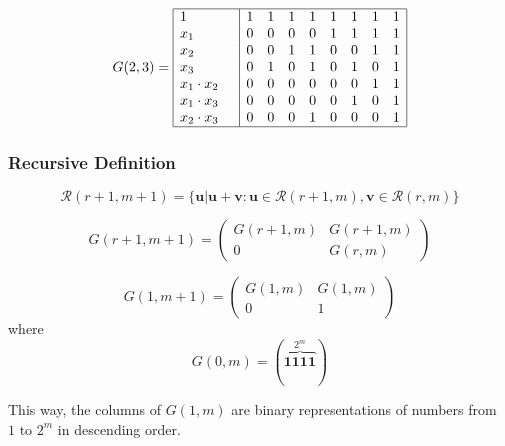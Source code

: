 \message{ !name(1.tex)}\documentclass[xcolor=xvgnames]{beamer}
\newcommand{\RM}[2]{\ensuremath{\mathcal{R}(#1,#2)}}
\newcommand{\V}[1]{\ensuremath{\mathbf{#1}}}
\begin{document}

\begin{frame}
 \begin{equation*}
G(2,3) =\begin{array}{|l|cccccccc|}
\hline
1 \quad&         1&1&1&1&1&1&1&1 \\
x_1 \quad&       0&0&0&0&1&1&1&1 \\
x_2 \quad&       0&0&1&1&0&0&1&1 \\
x_3 \quad&       0&1&0&1&0&1&0&1 \\
x_1\cdot x_2 \quad& 0&0&0&0&0&0&1&1 \\ 
x_1\cdot x_3 \quad& 0&0&0&0&0&1&0&1 \\
x_2\cdot x_3 \quad& 0&0&0&1&0&0&0&1 \\
\hline
\end{array}
\end{equation*}
\end{frame}


\begin{frame}
 \frametitle{Recursive Definition}
\begin{theorem}
\begin{equation*} \RM{r+1}{m+1} =  \{ \V{u} | \V{u}+\V{v} : \V{u} \in \RM{r+1}{m}, \V{v} \in \RM{r}{m} \} \end{equation*}
\end{theorem}

\begin{equation}
G(r+1,m+1) = \begin{pmatrix}
G(r+1,m) & G(r+1,m) \\
0 & G(r,m) 
\end{pmatrix}
\end{equation}


\begin{equation}
G(1,m+1) = \begin{pmatrix}
G(1,m) & G(1,m) \\
0 & 1
\end{pmatrix}
\end{equation}
where
\begin{equation*}
  G(0,m) = ( {\overbrace{\V{1111}}^{2^m}} )
\end{equation*}

This way, the columns of $G(1,m)$ are binary representations of numbers from $1 \text{ to } 2^m$ in descending order.

\end{frame}
\end{document}
